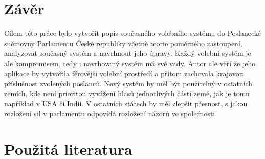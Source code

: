 \documentclass[12pt]{report}
\begin{document}
\section{Závěr} 
Cílem této práce bylo vytvořit popis současného volebního systému do Poslanecké sněmovny Parlamentu České republiky včetně teorie poměrného zastoupení, analyzovat současný systém a navrhnout jeho úpravy.
Každý volební systém je ale kompromisem, tedy i navrhovaný systém má své vady.
Autor ale věří že jeho aplikace by vytvořila férovější volební prostředí a přitom zachovala krajovou příslušnost zvolených poslanců.
Nový systém by měl být použitelný v ostatních zemích, kde není prioritou vyvážení hlasů jednotlivých částí země, jak je tomu například v USA či Indii.
V ostatních státech by měl zlepšit přesnost, s jakou rozložení sil v parlamentu odpovídá rozložení názorů ve společnosti.
\newpage
{}
\section*{Použitá literatura}
\printbibliography[heading=none]
\end{document}
